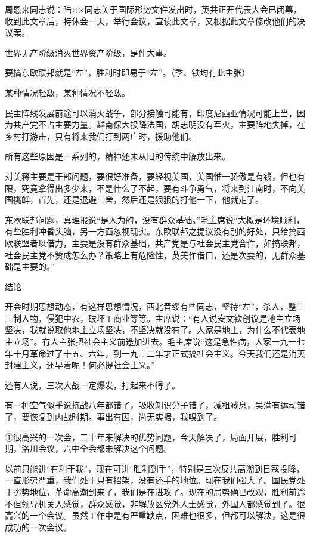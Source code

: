 周恩来同志说：陆××同志关于国际形势文件发出时，英共正开代表大会已闭幕，收到此文章后，特休会一天，举行会议，宣读此文章，又根据此文章修改他们的决议案。

世界无产阶级消灭世界资产阶级，是件大事。

要搞东欧联邦就是“左”，胜利时即易于“左”。（季、铁均有此主张）

某种情况轻敌，某种情况不轻敌。

民主阵线发展前途可以消灭战争，部分接触可能有，印度尼西亚情况可能上当，因为共产党不占主要力量。越南保大投降法国，胡志明没有军火，主要阵地失掉，在乡村打游击，只有将来我们打到两广时，援助他们。

所有这些原因是一系列的，精神还未从旧的传统中解放出来。

对美蒋主要是干部问题，要很好准备，要轻视美国，美国惟一骄傲是有钱，但也有限，究竟拿得出多少来，不是什么了不起，要有斗争勇气，将来到江南时，不向美国挑衅，首先，还是退避三舍，然后还是狠狠的打他一下，他就走了。

东欧联邦问题，真理报说“是人为的，没有群众基础。”毛主席说“大概是环境顺利，有些胜利冲昏头脑，另一方面忽视现实。东欧联邦之提议没有别的好处，只给搞西欧联盟者以借力，主要是没有群众基础，共产党是与社会民主党合作，如搞联邦，社会民主党不赞成怎么办？策略上有危险性，英美作借口，还是次要的，无群众基础是主要的。”

结论

开会时期思想动态，有这样思想情况，西北晋绥有些同志，坚持“左”，杀人，整三三制人物，侵犯中农，破坏工商业等等。主席说：“有人说安文钦创议是地主立场坚决，我就说取他地主立场坚决，不坚决就没有了。人家是地主，为什么不代表地主立场”。有人主张把社会主义前途加进去。毛主席说“这是急性病，人家一九一七年十月革命过了十五、六年，到一九三二年才正式搞社会主义。今天我们还是消灭封建主义，还早着呢！何必提社会主义。”

还有人说，三次大战一定爆发，打起来不得了。

有一种空气似乎说抗战八年都错了，吸收知识分子错了，减租减息，吴满有运动错了，要恢复到内战时期。事出有因，尚无实据，我嗅到了。

①很高兴的一次会，二十年来解决的优势问题，今天解决了，局面开展，胜利可期，洛川会议，六中全会都未解决这个问题。

以前只能讲“有利于我”，现在可讲“胜利到手”，特别是三次反共高潮到日寇投降，一直形势严重，我们处于只有招架，没有还手的地位。现在我们强大了。国民党处于劣势地位，革命高潮到来了，我们是在进攻了。现在的局势确已改观，胜利前途不但领导机关人感觉，群众感觉，非解放区党外人士感觉，外国人都感觉到了。很高兴的一个会议。虽然工作中是有严重缺点，困难也很多，但都可以解决，这是很成功的一次会议。

